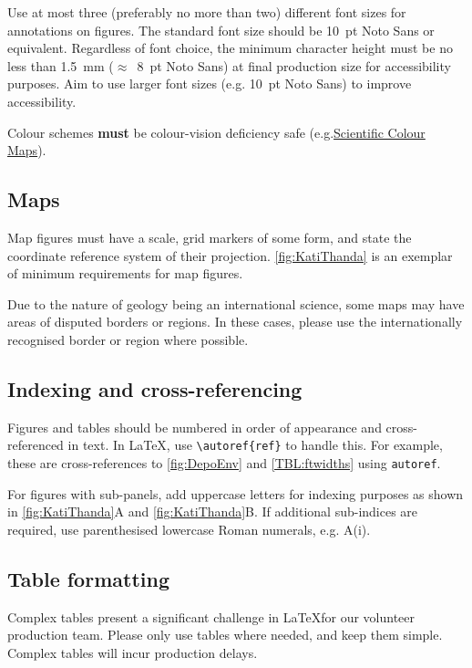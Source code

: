\documentclass[submission, anonymous]{sedimentologika}
\begin{document}
Use at most three (preferably no more than two) different font sizes for annotations on figures.
The standard font size should be \qty{10}{pt} Noto Sans or equivalent.
Regardless of font choice, the minimum character height must be no less than \qty{1.5}{\milli\metre} ($\approx$~\qty{8}{pt} Noto Sans) at final production size for accessibility purposes.
Aim to use larger font sizes (e.g. \qty{10}{pt} Noto Sans) to improve accessibility.

Colour schemes \textbf{must} be colour-vision deficiency safe (e.g.\href{https://zenodo.org/records/8409685}{Scientific Colour Maps}).

\subsection{Maps}

Map figures must have a scale, grid markers of some form, and state the coordinate reference system of their projection.
\autoref{fig:KatiThanda} is an exemplar of minimum requirements for map figures.

Due to the nature of geology being an international science, some maps may have areas of disputed borders or regions.
In these cases, please use the internationally recognised border or region where possible.

\subsection{Indexing and cross-referencing}

Figures and tables should be numbered in order of appearance and cross-referenced in text.
In \LaTeX, use \verb|\autoref{ref}| to handle this.
For example, these are cross-references to \autoref{fig:DepoEnv} and \autoref{TBL:ftwidths} using \verb|autoref|.

For figures with sub-panels, add uppercase letters for indexing purposes as shown in \autoref{fig:KatiThanda}A and \autoref{fig:KatiThanda}B.
If additional sub-indices are required, use parenthesised lowercase Roman numerals, e.g. A(i).

\subsection{Table formatting}
Complex tables present a significant challenge in \LaTeX\space for our volunteer production team.
Please only use tables where needed, and keep them simple.
Complex tables will incur production delays.
\end{document}
